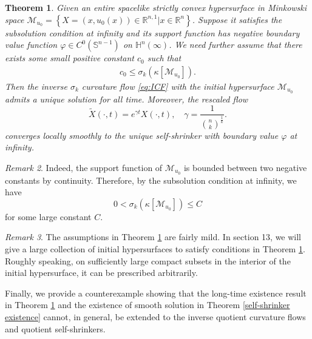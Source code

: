 \documentclass[reqno]{amsart}
\newtheorem{theorem}{Theorem}[section]
\theoremstyle{remark}
\newtheorem{remark}[theorem]{Remark}
\theoremstyle{definition}
\numberwithin{equation}{section}
\begin{document}
\begin{theorem}\label{inverse Hessian curvature flow}
    Given an entire spacelike strictly convex hypersurface in Minkowski space $\mathcal{M}_{u_0}=\left\{ X = (x,u_0(x)) \in \mathbb{R}^{n,1} | x \in \mathbb{R}^n \right\}$. Suppose it satisfies the \emph{subsolution condition at infinity} and its support function has negative boundary value function  $\varphi \in C^0(\mathbb{S}^{n-1})$ on $\mathbb{H}^n(\infty)$.
    We need further assume that there exists some small positive constant $c_0$ such that 
   \begin{align}\label{sigmak lower bound}
    c_0  \leqslant \sigma_k\left( \kappa\left[ \mathcal{M}_{u_0} \right] \right).
    \end{align}
    Then the inverse $\sigma_k$ curvature flow \eqref{eq:ICF} with the initial hypersurface $\mathcal{M}_{u_0}$ admits a unique solution for all time. Moreover, the rescaled flow 
        \[
        \tilde{X}(\cdot, t) = e^{\gamma t}X(\cdot, t), \quad \gamma = \frac{1}{\binom{n}{k}^{\frac{1}{k}}}.
        \]
    converges locally smoothly to the unique self-shrinker with boundary value $\varphi$ at infinity.
\end{theorem}
\begin{remark}\label{sigmak upper bound}
    Indeed, the support function of $\mathcal{M}_{u_0}$ is bounded between two negative constants by continuity. Therefore, by the subsolution condition at infinity, we have 
    $$0<\sigma_k\left( \kappa\left[ \mathcal{M}_{u_0} \right] \right) \leqslant C$$ for some large constant $C$.
\end{remark}

\begin{remark} The assumptions  in  Theorem  \ref{inverse Hessian curvature flow} are fairly mild. In section 13, we will give a large collection of initial hypersurfaces to satisfy conditions in Theorem  \ref{inverse Hessian curvature flow}. Roughly speaking, on sufficiently large compact subsets in the interior of the initial hypersurface, it can be prescribed arbitrarily.
\end{remark}
Finally, we provide a counterexample showing that the long-time existence result in Theorem \ref{inverse Hessian curvature flow} and the existence of smooth solution in Theorem \ref{self-shrinker existence} cannot, in general, be extended to the inverse quotient curvature flows and quotient self-shrinkers.
\end{document}
